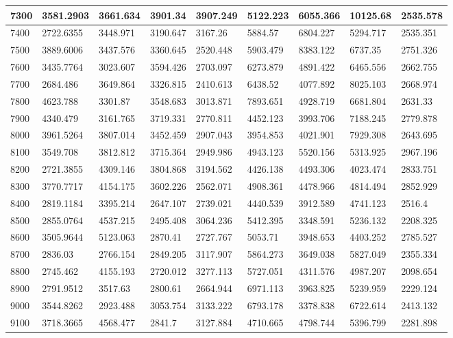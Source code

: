\begin{table}[]
{\begin{tabular}{|l|l|l|l|l|l|l|l|l|}
7300 & 3581.2903 & 3661.634 & 3901.34 & 3907.249 & 5122.223 & 6055.366 & 10125.68 & 2535.578 \\ \hline
7400 & 2722.6355 & 3448.971 & 3190.647 & 3167.26 & 5884.57 & 6804.227 & 5294.717 & 2535.351 \\ \hline
7500 & 3889.6006 & 3437.576 & 3360.645 & 2520.448 & 5903.479 & 8383.122 & 6737.35 & 2751.326 \\ \hline
7600 & 3435.7764 & 3023.607 & 3594.426 & 2703.097 & 6273.879 & 4891.422 & 6465.556 & 2662.755 \\ \hline
7700 & 2684.486 & 3649.864 & 3326.815 & 2410.613 & 6438.52 & 4077.892 & 8025.103 & 2668.974 \\ \hline
7800 & 4623.788 & 3301.87 & 3548.683 & 3013.871 & 7893.651 & 4928.719 & 6681.804 & 2631.33 \\ \hline
7900 & 4340.479 & 3161.765 & 3719.331 & 2770.811 & 4452.123 & 3993.706 & 7188.245 & 2779.878 \\ \hline
8000 & 3961.5264 & 3807.014 & 3452.459 & 2907.043 & 3954.853 & 4021.901 & 7929.308 & 2643.695 \\ \hline
8100 & 3549.708 & 3812.812 & 3715.364 & 2949.986 & 4943.123 & 5520.156 & 5313.925 & 2967.196 \\ \hline
8200 & 2721.3855 & 4309.146 & 3804.868 & 3194.562 & 4426.138 & 4493.306 & 4023.474 & 2833.751 \\ \hline
8300 & 3770.7717 & 4154.175 & 3602.226 & 2562.071 & 4908.361 & 4478.966 & 4814.494 & 2852.929 \\ \hline
8400 & 2819.1184 & 3395.214 & 2647.107 & 2739.021 & 4440.539 & 3912.589 & 4741.123 & 2516.4 \\ \hline
8500 & 2855.0764 & 4537.215 & 2495.408 & 3064.236 & 5412.395 & 3348.591 & 5236.132 & 2208.325 \\ \hline
8600 & 3505.9644 & 5123.063 & 2870.41 & 2727.767 & 5053.71 & 3948.653 & 4403.252 & 2785.527 \\ \hline
8700 & 2836.03 & 2766.154 & 2849.205 & 3117.907 & 5864.273 & 3649.038 & 5827.049 & 2355.334 \\ \hline
8800 & 2745.462 & 4155.193 & 2720.012 & 3277.113 & 5727.051 & 4311.576 & 4987.207 & 2098.654 \\ \hline
8900 & 2791.9512 & 3517.63 & 2800.61 & 2664.944 & 6971.113 & 3963.825 & 5239.959 & 2229.124 \\ \hline
9000 & 3544.8262 & 2923.488 & 3053.754 & 3133.222 & 6793.178 & 3378.838 & 6722.614 & 2413.132 \\ \hline
9100 & 3718.3665 & 4568.477 & 2841.7 & 3127.884 & 4710.665 & 4798.744 & 5396.799 & 2281.898 \\ \hline

\end{tabular}}
\end{table}
